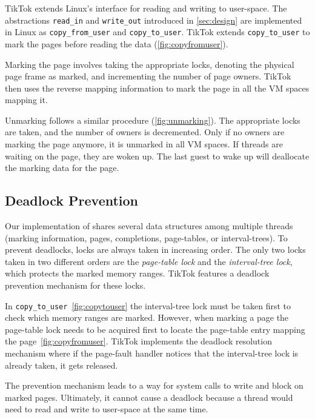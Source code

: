 \documentclass[conference]{IEEEtran}
\newcommand{\sysname}{TikTok}
\begin{document}
\sysname{} extends Linux's interface for reading and writing to user-space. The
abstractions \texttt{read\_in} and \texttt{write\_out} introduced in
\autoref{sec:design} are implemented in Linux as \texttt{copy\_from\_user} and
\texttt{copy\_to\_user}. \sysname{} extends \texttt{copy\_to\_user} to mark the pages
before reading the data (\autoref{fig:copyfromuser}).

Marking the page involves taking the appropriate locks, denoting the physical
page frame as marked, and incrementing the number of page owners. \sysname{} then
uses the reverse mapping information to mark the page in all the VM spaces
mapping it.

Unmarking follows a similar procedure (\autoref{fig:unmarking}). The appropriate
locks are taken, and the number of owners is decremented. Only if no owners are
marking the page anymore, it is unmarked in all VM spaces. If threads are
waiting on the page, they are woken up. The last guest to wake up will
deallocate the marking data for the page.

\subsection{Deadlock Prevention}
\label{subsec:deadlockprevention}
Our implementation of shares several data structures
among multiple threads (marking information, pages, completions, page-tables, or
interval-trees).
To prevent deadlocks, locks are always taken in increasing order.
The only two locks taken in two different orders are the
\emph{page-table lock} and the \emph{interval-tree lock}, which protects the marked
memory ranges. \sysname{} features a deadlock prevention mechanism for these locks.


In \texttt{copy\_to\_user}~\autoref{fig:copytouser} the interval-tree lock must
be taken first to check which memory ranges are marked. However, when marking a
page the page-table lock needs to be acquired first to locate the page-table
entry mapping the page~\autoref{fig:copyfromuser}. \sysname{} implements the
deadlock resolution mechanism where if the page-fault handler notices that the
interval-tree lock is already taken, it gets released.

The prevention mechanism leads to a way for system calls to write and block
on marked pages. Ultimately, it cannot cause a deadlock because a thread would
need to read and write to user-space at the same time. 
\end{document}

